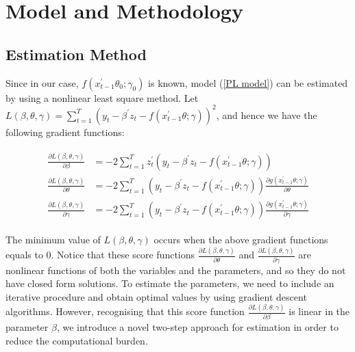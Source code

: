 \documentclass[a4paper,12pt,times,numbered,print,index]{report}
\numberwithin{equation}{section}
\begin{document}
%
\section{Model and Methodology}
\subsection{Estimation Method}
Since in our case, $f\left( x_{t-1}^{\prime }\theta_0; \gamma_0\right)$ is known, model (\ref{PL model}) can be estimated by using a nonlinear least square method. Let $L(\beta, \theta, \gamma) = \sum_{t=1}^{T} \left( y_t - \beta^{\prime} z_t - f\left( x_{t-1}^{\prime }\theta; \gamma\right)\right) ^2$, and hence we have the following gradient functions:


\begin{align}
	\begin{split}
	\frac{\partial L(\beta, \theta, \gamma)}{\partial \beta} &= -2\sum_{t=1}^{T} z_t^{\prime} \left( y_t - \beta^{\prime} z_t - f\left( x_{t-1}^{\prime }\theta; \gamma\right)\right) \\
	\frac{\partial L(\beta, \theta, \gamma)}{\partial \theta} &= -2\sum_{t=1}^{T} \left( y_t - \beta^{\prime} z_t - f\left( x_{t-1}^{\prime }\theta; \gamma\right)\right)\frac{\partial g(x_{t-1}^{\prime }\theta; \gamma)}{\partial \theta} \\
	\frac{\partial L(\beta, \theta, \gamma)}{\partial \gamma} &= -2\sum_{t=1}^{T} \left( y_t - \beta^{\prime} z_t - f\left( x_{t-1}^{\prime }\theta; \gamma\right)\right) \frac{\partial g(x_{t-1}^{\prime }\theta; \gamma)}{\partial \gamma}
	\end{split}
	\label{gradient}
\end{align}


The minimum value of $L(\beta, \theta, \gamma)$ occurs when the above gradient functions equals to 0. Notice that these score functions $\frac{\partial L(\beta, \theta, \gamma)}{\partial \theta}$ and $\frac{\partial L(\beta, \theta, \gamma)}{\partial \gamma}$ are nonlinear functions of both the variables and the parameters, and so they do not have closed form solutions. To estimate the parameters, we need to include an iterative procedure and obtain optimal values by using gradient descent algorithms. However, recognising that this score function $\frac{\partial L(\beta, \theta, \gamma)}{\partial \beta}$ is linear in the parameter $\beta$, we introduce a novel two-step approach for estimation in order to reduce the computational burden. 
\end{document}
